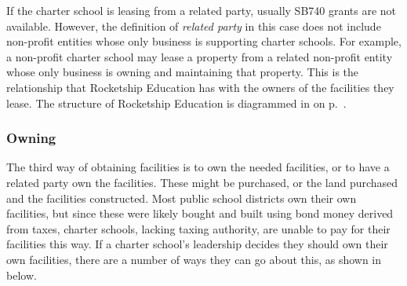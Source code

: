 If the charter school is leasing from a related party, usually SB740 grants are not available. However, the definition of \emph{related party} in this case does not include non-profit entities whose only business is supporting charter schools. For example, a non-profit charter school may lease a property from a related non-profit entity whose only business is owning and maintaining that property. This is the relationship that Rocketship Education has with the owners of the facilities they lease. The structure of Rocketship Education is diagrammed in  on p.~\pageref{fig:corporate-structure}.

\subsubsection{Owning}\label{sec:owning}\indent%

The third way of obtaining facilities is to own the needed facilities, or to have a related party own the facilities. These might be purchased, or the land purchased and the facilities constructed. Most public school districts own their own facilities, but since these were likely bought and built using bond money derived from taxes, charter schools, lacking taxing authority, are unable to pay for their facilities this way.
If a charter school's leadership decides they should own their own facilities, there are a number of ways they can go about this, as shown in  below.

